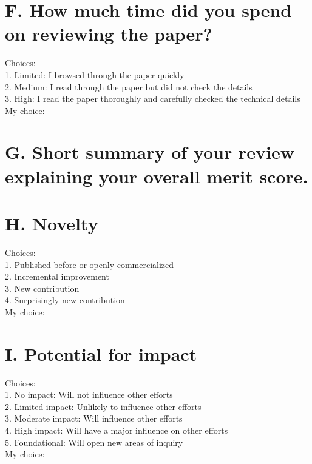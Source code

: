 \documentclass[]{ctexart}
\begin{document}
    \section{F. How much time did you spend on reviewing the paper?}
    \noindent Choices:\\
    \hspace*{2em}1. Limited: I browsed through the paper quickly\\
    \hspace*{2em}2. Medium: I read through the paper but did not check the details\\
    \hspace*{2em}3. High: I read the paper thoroughly and carefully checked the technical details\\
    My choice:
    \section{G. Short summary of your review explaining your overall merit score.}
    \section{H. Novelty}
    \noindent Choices:\\
    \hspace*{2em}1. Published before or openly commercialized\\
    \hspace*{2em}2. Incremental improvement\\
    \hspace*{2em}3. New contribution\\
    \hspace*{2em}4. Surprisingly new contribution\\
    My choice:
    \section{I. Potential for impact}
    \noindent Choices:\\
    \hspace*{2em}1. No impact: Will not influence other efforts\\
    \hspace*{2em}2. Limited impact: Unlikely to influence other efforts\\
    \hspace*{2em}3. Moderate impact: Will influence other efforts\\
    \hspace*{2em}4. High impact: Will have a major influence on other efforts\\
    \hspace*{2em}5. Foundational: Will open new areas of inquiry\\
    My choice:
\end{document}
